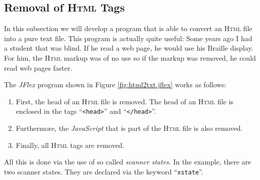 \subsection{Removal of  \textsc{Html} Tags}
In this subsection we will develop a program that is able to convert an 
\textsc{Html} file into a pure text file.  This program is actually quite useful: Some years ago I
had a student that was blind.  If he read a web page, he would use his Braille display.  For him,
the \textsc{Html} markup was of no use so if the markup was removed, he could read web pages faster.

The \textsl{JFlex} program shown in Figure \ref{fig:html2txt.jflex} works as follows:
\begin{enumerate}
\item First, the head of an  \textsc{Html} file is removed.  The head of an \textsc{Html} file is
      enclosed in the  tags ``\texttt{<head>}'' and ``\texttt{</head>}''.
\item Furthermore, the \textsl{JavaScript} that is part of the \textsc{Html} file is also removed.
\item Finally, all  \textsc{Html} tags are removed.
\end{enumerate}
All this is done via the use of so called \emph{scanner states}.  In the example, there are two
scanner states.  They are declared via the keyword
``\texttt{xstate}''. 

